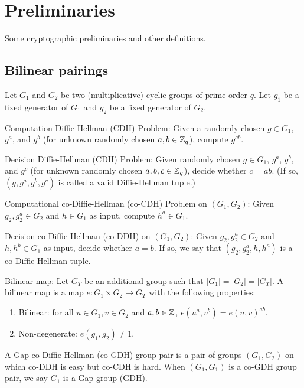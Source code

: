 \chapter{Preliminaries}

Some cryptographic preliminaries and other definitions.

\newpage

\section{Bilinear pairings}
\cite{DiHe76}

Let $G_1$ and $G_2$ be two (multiplicative) cyclic groups of prime order $q$. Let $g_1$ be a fixed generator of $G_1$ and $g_2$ be a fixed generator of $G_2$.

 Computation Diffie-Hellman (CDH) Problem: Given a randomly chosen $g \in G_1$, $g^a$, and $g^b$ (for unknown randomly chosen $a,b \in {\mathbb Z}_q$), compute $g^{ab}$.

 Decision Diffie-Hellman (CDH) Problem: Given randomly chosen $g \in G_1$, $g^a$, $g^b$, and $g^c$ (for unknown randomly chosen $a,b,c \in {\mathbb Z}_q$), decide whether $c = ab$. (If so, $(g, g^a, g^b, g^c)$ is called a valid Diffie-Hellman tuple.)

 Computational co-Diffie-Hellman (co-CDH) Problem on $(G_1, G_2)$: Given $g_2, g^a_2 \in G_2$ and $h \in G_1$ as input, compute $h^a \in G_1$.

 Decision co-Diffie-Hellman (co-DDH) on $(G_1, G_2)$: Given $g_2, g^a_2 \in G_2$ and $h, h^b \in G_1$ as input, decide whether $a=b$. If so, we say that $(g_2, g^a_2, h, h^a)$ is a co-Diffie-Hellman tuple.

 Bilinear map: Let $G_T$ be an additional group such that $ |G_1| = |G_2| = |G_T| $. A bilinear map is a map $e: G_1 \times G_2 \rightarrow G_T$ with the following properties:
\begin{enumerate}

\item Bilinear: for all $u \in G_1, v \in G_2$ and $a,b \in {\mathbb Z}$, $e(u^a, v^b) = e(u,v)^{ab}$.
\item Non-degenerate: $e(g_1, g_2) \neq 1$.

\end{enumerate}

 A Gap co-Diffie-Hellman (co-GDH) group pair is a pair of groups $(G_1, G_2)$ on which co-DDH is easy but co-CDH is hard. When $(G_1, G_1)$ is a co-GDH group pair, we say $G_1$ is a Gap group (GDH).

